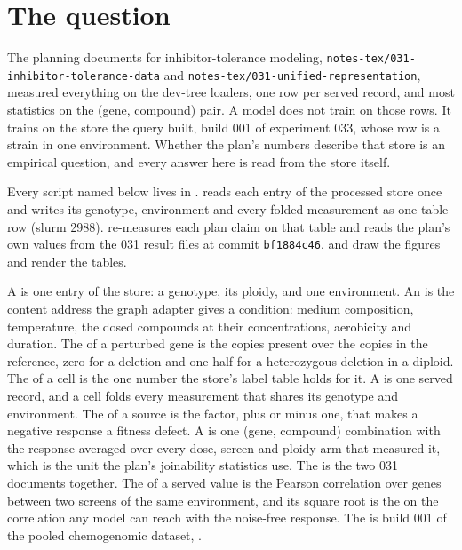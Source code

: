 
\section{The question}
\label{sec:question}

The planning documents for inhibitor-tolerance modeling,
\texttt{notes-tex/031-inhibitor-tolerance-data} and
\texttt{notes-tex/031-unified-representation}, measured everything on the dev-tree
loaders, one row per served record, and most statistics on the (gene, compound) pair. A
model does not train on those rows. It trains on the store the query built, build 001 of
experiment 033, whose row is a strain in one environment. Whether the plan's numbers
describe that store is an empirical question, and every answer here is read from the store
itself.

Every script named below lives in .
 reads each entry of the processed store once and writes its
genotype, environment and every folded measurement as one table row (slurm 2988).
 re-measures each plan claim on that table and reads the
plan's own values from the 031 result files at commit \texttt{bf1884c46}.
 and  draw the figures
and render the tables.

A  is one entry of the store: a genotype, its ploidy, and one environment. An
 is the content address the graph adapter gives a condition: medium
composition, temperature, the dosed compounds at their concentrations, aerobicity and
duration. The  of a perturbed gene is the copies present over the
copies in the reference, zero for a deletion and one half for a heterozygous deletion in a
diploid. The  of a cell is the one number the store's label table holds for it.
A  is one served record, and a cell folds every measurement that shares
its genotype and environment. The  of a source is the factor, plus or
minus one, that makes a negative response a fitness defect. A  is one (gene,
compound) combination with the response averaged over every dose, screen and ploidy arm
that measured it, which is the unit the plan's joinability statistics use. The 
is the two 031 documents together. The  of a served value is the Pearson
correlation over genes between two screens of the same environment, and its square root is
the  on the correlation any model can reach with the noise-free response. The
 is build 001 of the pooled chemogenomic dataset,
.

